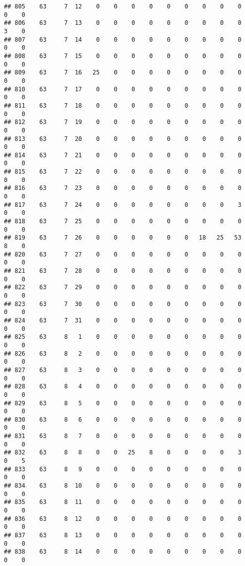\documentclass[]{article}
\begin{document}
\begin{verbatim}
## 805    63     7  12    0    0    0    0    0    0    0    0    0    0    0
## 806    63     7  13    0    0    0    0    0    0    0    0    0    3    0
## 807    63     7  14    0    0    0    0    0    0    0    0    0    0    0
## 808    63     7  15    0    0    0    0    0    0    0    0    0    0    0
## 809    63     7  16   25    0    0    0    0    0    0    0    0    0    0
## 810    63     7  17    0    0    0    0    0    0    0    0    0    0    0
## 811    63     7  18    0    0    0    0    0    0    0    0    0    0    0
## 812    63     7  19    0    0    0    0    0    0    0    0    0    0    0
## 813    63     7  20    0    0    0    0    0    0    0    0    0    0    0
## 814    63     7  21    0    0    0    0    0    0    0    0    0    0    0
## 815    63     7  22    0    0    0    0    0    0    0    0    0    0    0
## 816    63     7  23    0    0    0    0    0    0    0    0    0    0    0
## 817    63     7  24    0    0    0    0    0    0    0    0    3    0    0
## 818    63     7  25    0    0    0    0    0    0    0    0    0    0    0
## 819    63     7  26    0    0    0    0    0    0   18   25   53    8    0
## 820    63     7  27    0    0    0    0    0    0    0    0    0    0    0
## 821    63     7  28    0    0    0    0    0    0    0    0    0    0    0
## 822    63     7  29    0    0    0    0    0    0    0    0    0    0    0
## 823    63     7  30    0    0    0    0    0    0    0    0    0    0    0
## 824    63     7  31    0    0    0    0    0    0    0    0    0    0    0
## 825    63     8   1    0    0    0    0    0    0    0    0    0    0    0
## 826    63     8   2    0    0    0    0    0    0    0    0    0    0    0
## 827    63     8   3    0    0    0    0    0    0    0    0    0    0    0
## 828    63     8   4    0    0    0    0    0    0    0    0    0    0    0
## 829    63     8   5    0    0    0    0    0    0    0    0    0    0    0
## 830    63     8   6    0    0    0    0    0    0    0    0    0    0    0
## 831    63     8   7    0    0    0    0    0    0    0    0    0    0    0
## 832    63     8   8    0    0   25    8    0    0    0    0    3    0    5
## 833    63     8   9    0    0    0    0    0    0    0    0    0    0    0
## 834    63     8  10    0    0    0    0    0    0    0    0    0    0    0
## 835    63     8  11    0    0    0    0    0    0    0    0    0    0    0
## 836    63     8  12    0    0    0    0    0    0    0    0    0    0    0
## 837    63     8  13    0    0    0    0    0    0    0    0    0    0    0
## 838    63     8  14    0    0    0    0    0    0    0    0    0    0    0

\end{verbatim}
\end{document}
